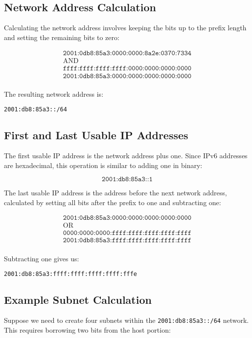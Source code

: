 \documentclass{article}
\begin{document}
\subsection*{Network Address Calculation}
Calculating the network address involves keeping the bits up to the prefix length and setting the remaining bits to zero:

\[
\begin{array}{c}
\texttt{2001:0db8:85a3:0000:0000:8a2e:0370:7334} \\
\text{AND} \\
\texttt{ffff:ffff:ffff:ffff:0000:0000:0000:0000} \\
\hline
\texttt{2001:0db8:85a3:0000:0000:0000:0000:0000} \\
\end{array}
\]

The resulting network address is:

\texttt{2001:db8:85a3::/64}

\subsection*{First and Last Usable IP Addresses}

The first usable IP address is the network address plus one. Since IPv6 addresses are hexadecimal, this operation is similar to adding one in binary:

\[
\texttt{2001:db8:85a3::1}
\]

The last usable IP address is the address before the next network address, calculated by setting all bits after the prefix to one and subtracting one:

\[
\begin{array}{c}
\texttt{2001:0db8:85a3:0000:0000:0000:0000:0000} \\
\text{OR} \\
\texttt{0000:0000:0000:ffff:ffff:ffff:ffff:ffff} \\
\hline
\texttt{2001:0db8:85a3:ffff:ffff:ffff:ffff:ffff} \\
\end{array}
\]

Subtracting one gives us:

\texttt{2001:db8:85a3:ffff:ffff:ffff:ffff:fffe}

\subsection*{Example Subnet Calculation}
Suppose we need to create four subnets within the \texttt{2001:db8:85a3::/64} network. This requires borrowing two bits from the host portion:
\end{document}
